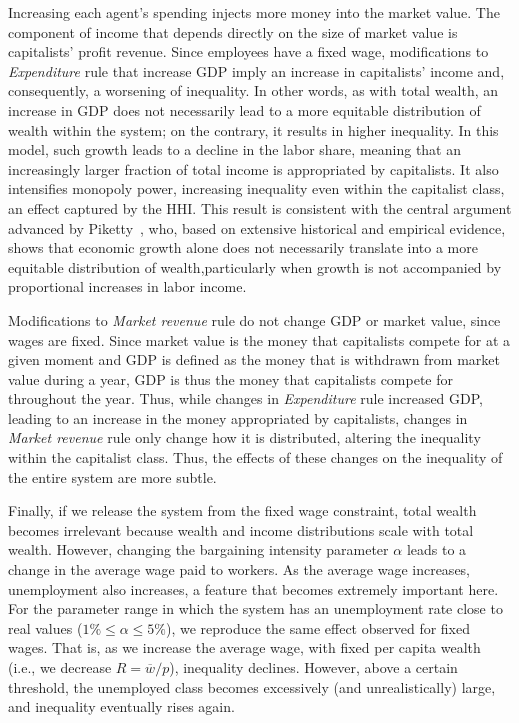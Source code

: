 Increasing each agent's spending injects more money into the market value. The component of income that depends directly on the size of market value is capitalists’ profit revenue. 
Since employees have a fixed wage, modifications  to {\it Expenditure } rule that increase GDP imply an increase in capitalists' income and, consequently, a worsening of inequality. 
In other words, as with total wealth, an increase in GDP does not necessarily lead to a more equitable distribution of wealth within the system; on the contrary, it results in higher inequality. 
In this model, such growth leads to a decline in the labor share, meaning that an increasingly larger fraction of total income is appropriated by capitalists. It also intensifies monopoly power, increasing inequality even within the capitalist class, an effect captured by the HHI.
This result is consistent with the central argument advanced by Piketty~\cite{piketty}, who, based on extensive historical and empirical evidence, shows that economic growth alone does not necessarily translate into a more equitable distribution of wealth,particularly when growth is not accompanied by proportional increases in labor income. 

Modifications to {\it Market revenue} rule do not change GDP or market value, since wages are fixed. Since market value is the money that capitalists compete for at a given moment and GDP is defined as the money that is withdrawn from market value during a year,  GDP is thus the money that capitalists compete for throughout the year. Thus, while changes in {\it Expenditure} rule increased GDP, leading to an increase in the money appropriated by capitalists, changes in {\it Market revenue} rule only change how it is distributed, altering the inequality within the capitalist class. Thus, the effects of these changes on the inequality of the entire system are more subtle.  

Finally, if we release the system from the fixed wage constraint, total wealth becomes irrelevant because wealth and income distributions scale with total wealth. However, changing the bargaining intensity parameter $\alpha$ leads to a change in the average wage paid to workers. As the average wage increases, unemployment also increases, a feature that becomes extremely important here. For the parameter range in which the system has an unemployment rate close to real values ($1\%\leq\alpha\leq5\%$), we reproduce the same effect observed for fixed wages. That is, as we increase the average wage, with fixed per capita wealth (i.e., we decrease $R=\overline{w}/p$), inequality declines. However, above a certain threshold, the unemployed class becomes excessively (and unrealistically) large, and inequality eventually rises again.